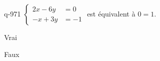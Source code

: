 \begin{truefalse}{q-971}
$\begin{cases} 2x-6y &=0 \\ -x+3y &= -1\end{cases}$ est équivalent à $0=1$.
\item* Vrai
\item Faux
\end{truefalse}

